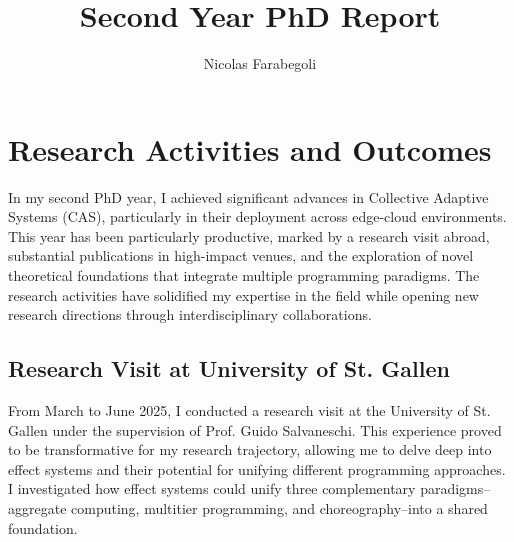 \documentclass[runningheads]{llncs}
\begin{document}
%
\title{Second Year PhD Report}
%
%
\author{Nicolas Farabegoli}%
%
%
%
\maketitle              %
%

%
%
%
\section{Research Activities and Outcomes}
In my second PhD year,
I achieved significant advances in Collective Adaptive Systems (CAS),
particularly in their deployment across edge-cloud environments.
%
This year has been particularly productive,
marked by a research visit abroad,
substantial publications in high-impact venues,
and the exploration of novel theoretical foundations that integrate multiple programming paradigms.
%
The research activities have solidified my expertise in the field while opening new research directions through interdisciplinary collaborations.

\subsection{Research Visit at University of St. Gallen}

From March to June 2025,
I conducted a research visit at the University of St. Gallen under the supervision of Prof. Guido Salvaneschi.
%
This experience proved to be transformative for my research trajectory,
allowing me to delve deep into effect systems and their potential for unifying different programming approaches.
%
I investigated how effect systems could unify three complementary paradigms--aggregate computing,
multitier programming,
and choreography--into a shared foundation.
\end{document}
